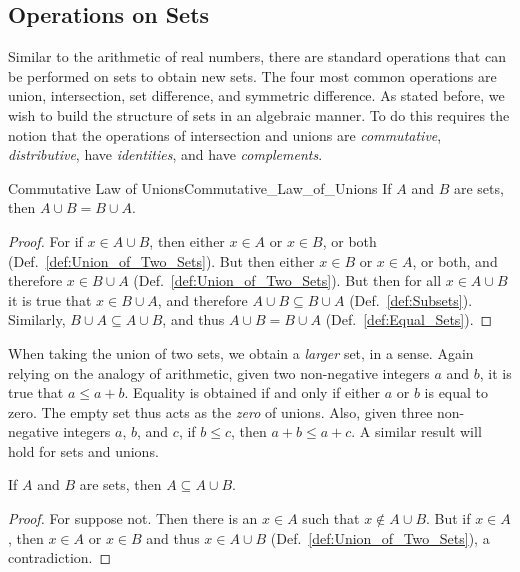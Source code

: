     \subsection{Operations on Sets}
        Similar to the arithmetic of real numbers, there are standard operations
        that can be performed on sets to obtain new sets. The four most common
        operations are union, intersection, set difference, and symmetric
        difference. As stated before, we wish to build the structure of sets in
        an algebraic manner. To do this requires the notion that the operations
        of intersection and unions are \textit{commutative},
        \textit{distributive}, have \textit{identities}, and have
        \textit{complements}.
        \begin{ltheorem}{Commutative Law of Unions}{Commutative_Law_of_Unions}
            If $A$ and $B$ are sets, then $A\cup{B}=B\cup{A}$.
        \end{ltheorem}
        \begin{proof}
            For if $x\in{A}\cup{B}$, then either $x\in{A}$ or $x\in{B}$, or both
            (Def.~\ref{def:Union_of_Two_Sets}). But then either $x\in{B}$ or
            $x\in{A}$, or both, and therefore $x\in{B}\cup{A}$
            (Def.~\ref{def:Union_of_Two_Sets}). But then for all
            $x\in{A}\cup{B}$ it is true that $x\in{B}\cup{A}$, and therefore
            $A\cup{B}\subseteq{B}\cup{A}$ (Def.~\ref{def:Subsets}). Similarly,
            $B\cup{A}\subseteq{A}\cup{B}$, and thus
            $A\cup{B}=B\cup{A}$ (Def.~\ref{def:Equal_Sets}).
        \end{proof}
        When taking the union of two sets, we obtain a \textit{larger} set, in
        a sense. Again relying on the analogy of arithmetic, given two
        non-negative integers $a$ and $b$, it is true that $a\leq{a}+b$.
        Equality is obtained if and only if either $a$ or $b$ is equal to zero.
        The empty set thus acts as the \textit{zero} of unions. Also, given
        three non-negative integers $a$, $b$, and $c$, if $b\leq{c}$, then
        $a+b\leq{a}+c$. A similar result will hold for sets and unions.
        \begin{theorem}
            \label{thm:Union_is_Bigger}%
            If $A$ and $B$ are sets, then $A\subseteq{A}\cup{B}$.
        \end{theorem}
        \begin{proof}
            For suppose not. Then there is an $x\in{A}$ such that
            $x\notin{A}\cup{B}$. But if $x\in{A}$, then $x\in{A}$ or $x\in{B}$
            and thus $x\in{A}\cup{B}$ (Def.~\ref{def:Union_of_Two_Sets}), a
            contradiction.
        \end{proof}
